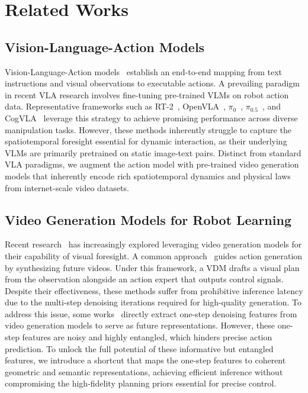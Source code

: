 \documentclass[runningheads]{llncs}
\begin{document}


\section{Related Works}
\subsection{Vision-Language-Action Models}

Vision-Language-Action models~\cite{brohan2022rt,zitkovich2023rt,song2025reconvla,lin2025hif,li2024visionlanguage,kim2025openvla} establish an end-to-end mapping from text instructions and visual observations to executable actions. A prevailing paradigm in recent VLA research involves fine-tuning pre-trained VLMs on robot action data. Representative frameworks such as RT-2~\cite{zitkovich2023rt}, OpenVLA~\cite{kim2025openvla}, $\pi_{0}$~\cite{black2024pi_0}, $\pi_{0.5}$~\cite{intelligence2025pi_}, and CogVLA~\cite{li2025cogvla} leverage this strategy to achieve promising performance across diverse manipulation tasks. However, these methods inherently struggle to capture the spatiotemporal foresight essential for dynamic interaction, as their underlying VLMs are primarily pretrained on static image-text pairs.
Distinct from standard VLA paradigms, we augment the action model with pre-trained video generation models that inherently encode rich spatiotemporal dynamics and physical laws from internet-scale video datasets.

\subsection{Video Generation Models for Robot Learning}
Recent research~\cite{finn2016unsupervised,zhou2024robodreamer,huvideo,xie2025human2robot,kim2026cosmos,pai2025mimicvideovideoactionmodelsgeneralizable,black2024zeroshot,du2023learning,feng2025vidar} has increasingly explored leveraging video generation models for their capability of visual foresight. A common approach~\cite{NEURIPS2023_46a12649, black2024zeroshot,du2023learning,feng2025vidar} guides action generation by synthesizing future videos. Under this framework, a VDM drafts a visual plan from the observation alongside an action expert that outputs control signals. Despite their effectiveness, these methods suffer from prohibitive inference latency due to the multi-step denoising iterations required for high-quality generation. To address this issue, some works~\cite{huvideo,xie2025human2robot} directly extract one-step denoising features from video generation models to serve as future representations. However, these one-step features are noisy and highly entangled, which hinders precise action prediction. To unlock the full potential of these informative but entangled features, we introduce a shortcut that maps the one-step features to coherent geometric and semantic representations, achieving efficient inference without compromising the high-fidelity planning priors essential for precise control.
\end{document}
